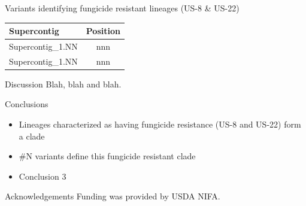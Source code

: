 \documentclass[final,t]{beamer}
\begin{document}
\begin{frame}{}
\begin{columns}[t]
\begin{column}{.28\linewidth}
  \begin{block}{Variants identifying fungicide resistant lineages (US-8 \& US-22)}
    \begin{table}
    \begin{tabular}{lc}
      \hline
        \textbf{Supercontig} & \textbf{Position} \\
      \hline
        Supercontig\_1.NN & nnn \\
        Supercontig\_1.NN & nnn \\
      \hline
    \end{tabular}
    \end{table}

  \end{block}
      
  \begin{block}{Discussion}
    Blah, blah and blah.

  \end{block}

                
      \begin{block}{Conclusions}
        \begin{itemize}
        \item Lineages characterized as having fungicide resistance (US-8 and US-22) form a clade
        \item \#N variants define this fungicide resistant clade
        \item Conclusion 3
        \end{itemize}
        \vspace{-1ex}
      \end{block}

      \begin{block}{Acknowledgements}
Funding was provided by USDA NIFA.
      \end{block}

    \end{column}
  \end{columns}
\end{frame}
\end{document}
